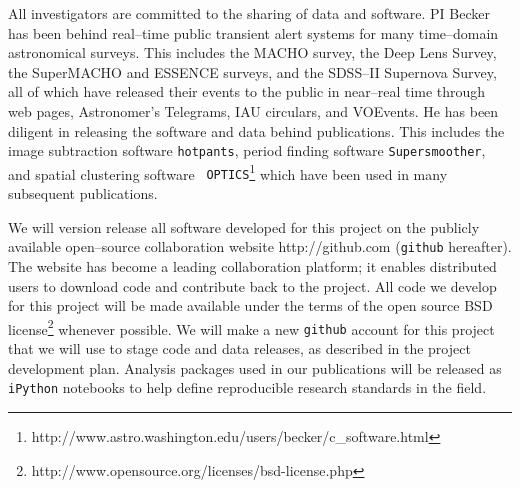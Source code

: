All investigators are committed to the sharing of data and software.
PI Becker has been behind real--time public transient alert systems
for many time--domain astronomical surveys.  This includes the MACHO
survey, the Deep Lens Survey, the SuperMACHO and ESSENCE surveys, and
the SDSS--II Supernova Survey, all of which have released their events
to the public in near--real time through web pages, Astronomer's
Telegrams, IAU circulars, and VOEvents.  He has been diligent in
releasing the software and data behind publications.  This includes
the image subtraction software {\tt hotpants}, period finding software
{\tt Supersmoother}, and spatial clustering software {\tt
  OPTICS}\footnote{http://www.astro.washington.edu/users/becker/c\_software.html}
which have been used in many subsequent publications.

We will version release all software developed for this project on the
publicly available open--source collaboration website
http://github.com ({\tt github} hereafter).  The website has become a
leading collaboration platform; it enables distributed users to
download code and contribute back to the project.  All code we develop
for this project will be made available under the terms of the open
source BSD
license\footnote{http://www.opensource.org/licenses/bsd-license.php}
whenever possible.  We will make a new {\tt github} account for this
project that we will use to stage code and data releases, as described
in the project development plan.  Analysis packages used in our
publications will be released as {\tt iPython} notebooks to help
define reproducible research standards in the field.


